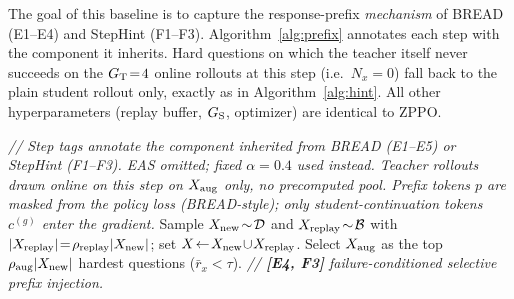 \documentclass{llmxive}
\begin{document}
The goal of this baseline is to capture the response-prefix \emph{mechanism} of BREAD (E1--E4) and StepHint (F1--F3). Algorithm~\ref{alg:prefix} annotates each step with the component it inherits. Hard questions on which the teacher itself never succeeds on the $G_{\rm T}\!=\!4$ online rollouts at this step (i.e.\ $N_x\!=\!0$) fall back to the plain student rollout only, exactly as in Algorithm~\ref{alg:hint}. All other hyperparameters (replay buffer, $G_{\rm S}$, optimizer) are identical to ZPPO.
\begin{algorithm*}[!htbp]
\SetAlgoLined
\DontPrintSemicolon
{}
\textit{// Step tags annotate the component inherited from BREAD (E1--E5) or StepHint (F1--F3). EAS omitted; fixed $\alpha\!=\!0.4$ used instead. Teacher rollouts drawn \emph{online on this step} on $X_{\rm aug}$ only, no precomputed pool. Prefix tokens $p$ are masked from the policy loss (BREAD-style); only student-continuation tokens $c^{(g)}$ enter the gradient.}\;
Sample $X_{\rm new}\!\sim\!\mathcal{D}$ and $X_{\rm replay}\!\sim\!\mathcal{B}$ with $|X_{\rm replay}|\!=\!\rho_{\rm replay}|X_{\rm new}|$; set $X\!\leftarrow\!X_{\rm new}\!\cup\!X_{\rm replay}$.\;
Select $X_{\rm aug}$ as the top $\rho_{\rm aug}|X_{\rm new}|$ hardest questions ($\bar{r}_x\!<\!\tau$). \textit{// \textbf{[E4, F3]} failure-conditioned selective prefix injection.}\;
\end{algorithm*}
\end{document}
